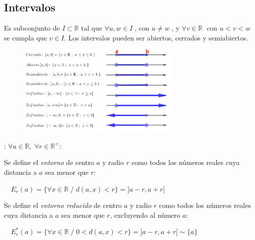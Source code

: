		
	
	\subsection{Intervalos}
	
	\begin{defi} Es subconjunto de $I \subset \mathbb R$ tal que $\forall u,w \in I\; $, con $u\neq w\; $, y $\forall v \in \mathbb R\; $ con $u<v<w\; $ se cumpla que $v\in I$. Los intervalos pueden ser abiertos, cerrados y semiabiertos.\end{defi}
	
		\begin{figure}[H]
			\centering
			\includegraphics[width=0.7\textwidth]{imagenes/imagenes01/T01IM03.png}
		\end{figure}
		
		
		\begin{defi}[Entorno]: $\forall a \in \mathbb R, \; \forall r \in \mathbb R^{+}: $
		
		Se define el \emph{entorno} de centro $a$ y radio $r$ como todos los números reales cuya distancia a $a$ sea menor que $r$:
		
		$\quad E_r(a)=\{ \forall x \in \mathbb R \;  / \; d(a,x)<r \}=]a-r,a+r[$
		
		Se define el \emph{entorno reducido} de centro $a$ y radio $r$ como todos los números reales cuya distancia a $a$ sea menor que $r$, excluyendo al número $a$:
		
		$\quad E^*_r(a)=\{ \forall x \in \mathbb R \;  / \; 0<d(a,x)<r \}=]a-r,a+r[\sim \{a\}$
			
		\end{defi}
		
